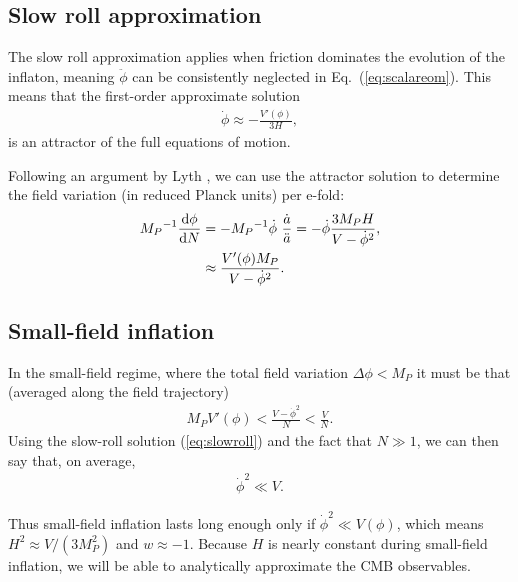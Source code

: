 \documentclass[aps,amsfonts,amsmath,prd,preprint,nofootinbib,superscriptaddress]{revtex4}
\newcommand{\Mp}{{M_{P}}}
\newcommand{\MMp}{{M_P^2}}
\newcommand{\rmd}{{\rm d}}
\begin{document}
\begin{appendix}














\subsection{Slow roll approximation}

The slow roll approximation applies when friction dominates the evolution of the inflaton, meaning $\ddot \phi$ can be consistently neglected in  Eq.~(\ref{eq:scalareom}).  
This means that the first-order approximate solution
\begin{align}
\dot\phi \approx -\frac{V'(\phi)}{3 H},\label{eq:slowroll}
\end{align}
is an attractor of the full equations of motion.


Following an argument by Lyth \cite{lythbound}, we can use the attractor solution to determine the field variation (in reduced Planck units) per e-fold:
\begin{align}
\Mp^{-1}\frac{\rmd \phi}{\rmd N} &= -\Mp^{-1}\dot\phi~\frac{\dot a}{\ddot a} = -\dot\phi \frac{3\Mp H}{V-\dot\phi^2},\\
&\approx \frac{V'(\phi)\Mp}{V-\dot\phi^2}.
\end{align}


\subsection{Small-field inflation}\label{sec:smallfield}
In the small-field regime, where the total field variation $\Delta \phi < \Mp$ it must be that (averaged along the field trajectory)
\begin{align}
\Mp V'(\phi) <  \frac{V - \dot\phi^2}{N} <  \frac{V}{N}.
\end{align} 
Using the slow-roll solution (\ref{eq:slowroll}) and the fact that $N \gg 1$, we can then say that, on average,
\begin{align}
\dot\phi^2 \ll V.
\end{align}

Thus small-field inflation lasts long enough only if $\dot\phi^2 \ll V(\phi)$, which means $H^2 \approx V/(3\MMp)$ and $w \approx -1$.
Because $H$ is nearly constant during small-field inflation, we will be able to analytically approximate the CMB observables.



\end{appendix}
\end{document}
